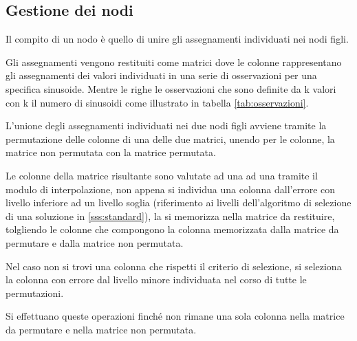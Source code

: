 \documentclass[a4paper,12pt]{report}
\begin{document}
  \subsection{Gestione dei nodi}
  \label{ss:non_foglia}
  Il compito di un nodo è quello di unire gli assegnamenti individuati nei nodi figli.

  Gli assegnamenti vengono restituiti come matrici dove le colonne rappresentano gli assegnamenti dei valori individuati in una serie di osservazioni per una specifica sinusoide. Mentre le righe le osservazioni che sono definite da k valori con k il numero di sinusoidi come illustrato in tabella \ref{tab:osservazioni}.

  L'unione degli assegnamenti individuati nei due nodi figli avviene tramite la permutazione delle colonne di una delle due matrici, unendo per le colonne, la matrice non permutata con la matrice permutata.

  Le colonne della matrice risultante sono valutate ad una ad una tramite il modulo di interpolazione, non appena si individua una colonna dall'errore con livello inferiore ad un livello soglia (riferimento ai livelli dell'algoritmo di selezione di una soluzione in \ref{sss:standard}), la si memorizza nella matrice da restituire, tolgliendo le colonne che compongono la colonna memorizzata dalla matrice da permutare e dalla matrice non permutata.

  Nel caso non si trovi una colonna che rispetti il criterio di selezione, si seleziona la colonna con errore dal livello minore individuata nel corso di tutte le permutazioni.

  Si effettuano queste operazioni finché non rimane una sola colonna nella matrice da permutare e nella matrice non permutata.
\end{document}
